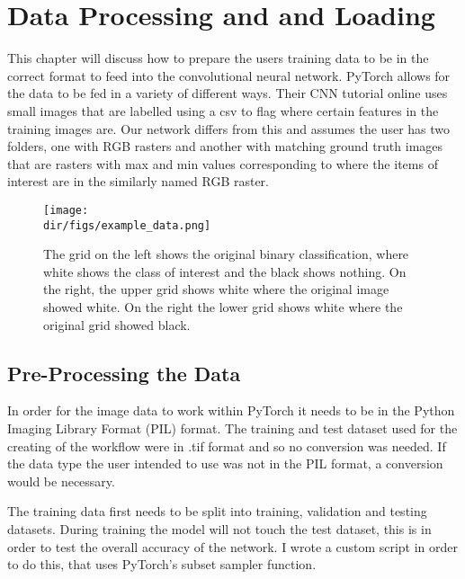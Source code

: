 \chapter{Data Processing and and Loading}
This chapter will discuss how to prepare the users training data to be in the correct format to feed into the convolutional neural network. PyTorch allows for the data to be fed in a variety of different ways. Their CNN tutorial online uses small images that are labelled using a csv to flag where certain features in the training images are. Our network differs from this and assumes the user has two folders, one with RGB rasters and another with matching ground truth images that are rasters with max and min values corresponding to where the items of interest are in the similarly named RGB raster. 

\begin{figure}[htbp]
    \centering
    \texttt{[image: \\dir/figs/example\_data.png]}
    \caption[Side by Side comparison of RGB image and ground truth]{The grid on the left shows the original binary classification, where white shows the class of interest and the black shows nothing. On the right, the upper grid shows white where the original image showed white. On the right the lower grid shows white where the original grid showed black.}
    \label{fig.example_data}
\end{figure}


\section{Pre-Processing the Data}
In order for the image data to work within PyTorch it needs to be in the Python Imaging Library Format (PIL) format. The training and test dataset used for the creating of the workflow were in .tif format and so no conversion was needed. If the data type the user intended to use was not in the PIL format, a conversion would be necessary.
\par
The training data first needs to be split into training, validation and testing datasets. During training the model will not touch the test dataset, this is in order to test the overall accuracy of the network. I wrote a custom script in order to do this, that uses PyTorch's subset sampler function.
